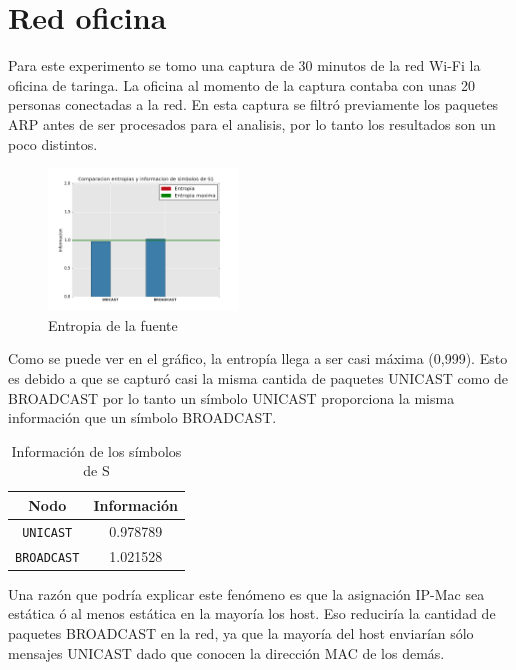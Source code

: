 \section{Red oficina}

Para este experimento se tomo una captura de 30 minutos de la red Wi-Fi la oficina de taringa.
La oficina al momento de la captura contaba con unas 20 personas conectadas a la red.
En esta captura se filtró previamente los paquetes ARP antes de ser procesados para el analisis,
por lo tanto los resultados son un poco distintos.

\begin{figure}[H]
  \centering
    \includegraphics[width=0.45\textwidth]{grafico1-red-taringa.png}
  \caption{Entropia de la fuente}
  \label{entropia-taringa-1}
\end{figure}

Como se puede ver en el gráfico, la entropía llega a ser casi máxima (0,999). 
Esto es debido a que se capturó casi la misma cantida de paquetes UNICAST como de BROADCAST
por lo tanto un símbolo UNICAST proporciona la misma información que un símbolo BROADCAST.

    \begin{table}[ht]\begin{center}
      \begin{tabular}{|c|c|}
      \hline
      \textbf{Nodo} & \textbf{Información} \\ \hline
      \texttt{UNICAST}& 0.978789 \\ \hline
      \texttt{BROADCAST}& 1.021528 \\ \hline
      \end{tabular}
      \caption{Información de los símbolos de S}
      \label{info-simbolos}
    \end{center}\end{table}
    
Una razón que podría explicar este fenómeno es que la asignación IP-Mac sea estática ó al menos estática en la mayoría los host.
Eso reduciría la cantidad de paquetes BROADCAST en la red, ya que la mayoría del host enviarían sólo mensajes UNICAST dado 
que conocen la dirección MAC de los demás.

